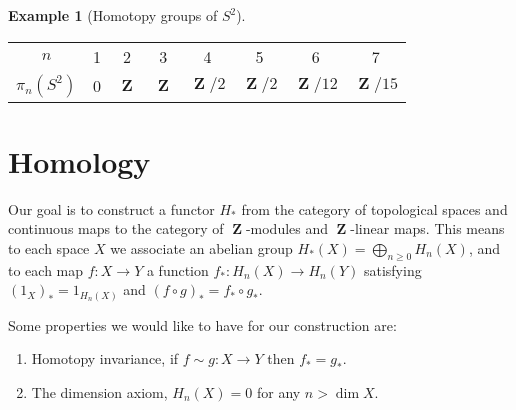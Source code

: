 \documentclass[10pt,]{book}
\theoremstyle{plain}
\theoremstyle{definition}
\newtheorem{example}[theorem]{Example}
\numberwithin{equation}{section}
\renewenvironment{table}%
{\begin{mbxtable}\setcounter{mbxtable}{\value{theorem}}\stepcounter{theorem}}%
{\end{mbxtable}}
\DeclareMathOperator{\ZZ}{\mathbf{Z}}
\begin{document}
\begin{example}[Homotopy groups of \(S^2\)]\label{example-3}
\begin{table}
\centering
\begin{tabular}{*{8}{c}}
\(n\)&1&2&3&4&5&6&7\\
\(\pi_n(S^2)\)&0&\(\ZZ\)&\(\ZZ\)&\(\ZZ/2\)&\(\ZZ/2\)&\(\ZZ/12\)&\(\ZZ/15\)\\
\end{tabular}
\end{table}
\end{example}
\typeout{************************************************}
\typeout{************************************************}
\section[Homology]{Homology}\label{sec-homology}

          Our goal is to construct a functor \(H_*\) from the category of topological spaces and continuous maps to the category of \(\ZZ\)-modules and \(\ZZ\)-linear maps.
          This means to each space \(X\) we associate an abelian group \(H_*(X) = \bigoplus_{n\ge 0}H_n(X)\), and to each map \(f\colon X \to Y\) a function \(f_*\colon H_n(X) \to H_n(Y)\) satisfying \((1_X)_* = 1_{H_n(X)}\) and \((f\circ g)_* = f_* \circ g_*\).
\par

          Some properties we would like to have for our construction are:
          \begin{enumerate}
\item{}Homotopy invariance, if \(f \sim g \colon X \to Y\) then \(f_* = g_*\).\item{}The dimension axiom, \(H_n(X) = 0\) for any \(n > \dim X\).\end{enumerate}

\typeout{************************************************}
\typeout{************************************************}
\end{document}
